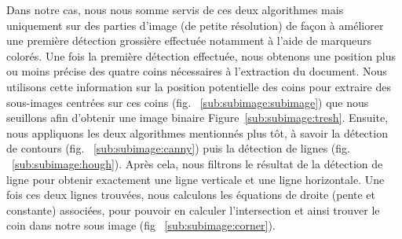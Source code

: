 Dans notre cas, nous nous somme servis de ces deux algorithmes mais uniquement sur des parties d'image (de petite résolution) de façon à améliorer une première détection grossière effectuée notamment à l'aide de marqueurs colorés. Une fois la première détection effectuée, nous obtenons une position plus ou moins précise des quatre coins nécessaires à l'extraction du document. Nous utilisons cette information sur la position potentielle des coins pour extraire des sous-images centrées sur ces coins (fig. ~\ref{sub:subimage:subimage}) que nous seuillons afin d'obtenir une image binaire Figure~\ref{sub:subimage:tresh}. Ensuite, nous appliquons les deux algorithmes mentionnés plus tôt, à savoir la détection de contours (fig. ~\ref{sub:subimage:canny}) puis la détection de lignes (fig. ~\ref{sub:subimage:hough}). Après cela, nous filtrons le résultat de la détection de ligne pour obtenir exactement une ligne verticale et une ligne horizontale. Une fois ces deux lignes trouvées, nous calculons les équations de droite (pente et constante) associées, pour pouvoir en calculer l'intersection et ainsi trouver le coin dans notre sous image (fig ~\ref{sub:subimage:corner}).

